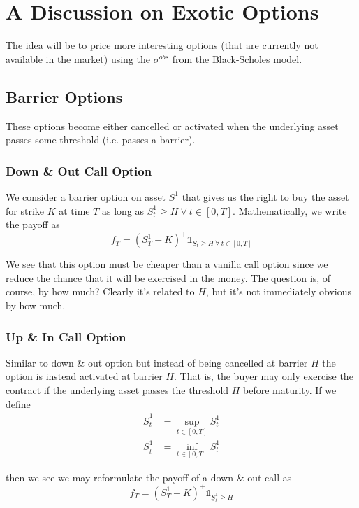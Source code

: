 \documentclass[12pt]{article}
\newlength\tindent
\renewcommand{\indent}{\hspace*{\tindent}}
\begin{document}
\section{A Discussion on Exotic Options}

\indent The idea will be to price more interesting options (that are currently not available in the market) using the $\sigma^{obs}$ from the Black-Scholes model.

\subsection{Barrier Options}

\indent These options become either cancelled or activated when the underlying asset passes some threshold (i.e. passes a barrier).

\subsubsection{Down \& Out Call Option}

\indent We consider a barrier option on asset $S^1$ that gives us the right to buy the asset for strike $K$ at time $T$ as long as $S^1_t \geq H~\forall~t\in[0,T]$. Mathematically, we write the payoff as
\begin{equation*}
	f_T = (S^1_T - K)^+\mathds 1_{S_t \geq H~\forall~t\in[0,T]}
\end{equation*}

\indent We see that this option must be cheaper than a vanilla call option since we reduce the chance that it will be exercised in the money. The question is, of course, by how much? Clearly it's related to $H$, but it's not immediately obvious by how much.

\subsubsection{Up \& In Call Option}

\indent Similar to down \& out option but instead of being cancelled at barrier $H$ the option is instead activated at barrier $H$. That is, the buyer may only exercise the contract if the underlying asset passes the threshold $H$ before maturity. If we define
\begin{align*}
	\overline{S}^1_t &= \sup_{t\in[0,T]}S^1_t \\
	\underline{S}^1_t &= \inf_{t\in[0,T]}S^1_t
\end{align*}

then we see we may reformulate the payoff of a down \& out call as
\begin{equation*}
	f_T = (S^1_T - K)^+\mathds 1_{\underline{S}^1_t\geq H}
\end{equation*}
\end{document}
